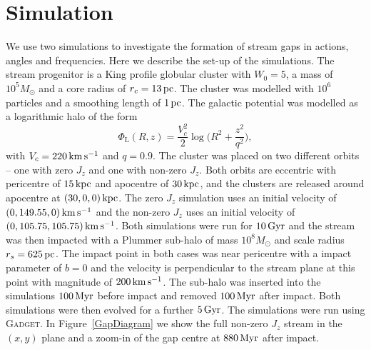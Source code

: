 \documentclass[useAMS,usenatbib,fleqn,a4paper]{mn2e}
\def\kpc{\,{\rm kpc}}
\def\pc{\,{\rm pc}}
\def\kms{\,{\rm km\,s^{-1}}}
\def\Gyr{\,{\rm Gyr}}
\def\Myr{\,{\rm Myr}}
\begin{document}
\section{Simulation}
We use two simulations to investigate the formation of stream gaps in actions, angles and frequencies. Here we describe the set-up of the simulations. The stream progenitor is a King profile globular cluster with $W_0=5$, a mass of $10^5 M_\odot$ and a core radius of $r_c=13\pc$. The cluster was modelled with $10^6$ particles and a smoothing length of $1\pc$.
The galactic potential was modelled as a logarithmic halo of the form
\begin{equation}
\Phi_\mathrm{L}(R,z) = \frac{V_c^2}{2}\log\Big(R^2+\frac{z^2}{q^2}\Big),
\end{equation}
with $V_c = 220\kms$ and $q = 0.9$. The cluster was placed on two different orbits -- one with zero $J_z$ and one with non-zero $J_z$. Both orbits are eccentric with pericentre of $15\kpc$ and apocentre of $30\kpc$, and the clusters are released around apocentre at $(30,0,0)\kpc$. The zero $J_z$ simulation uses an initial velocity of $(0,149.55,0)\kms$ and the non-zero $J_z$ uses an initial velocity of $(0, 105.75, 105.75)\kms$. Both simulations were run for $10\Gyr$ and the stream was then impacted with a Plummer sub-halo of mass $10^8M_\odot$ and scale radius $r_s=625\pc$. The impact point in both cases was near pericentre with a impact parameter of $b=0$ and the velocity is perpendicular to the stream plane at this point with magnitude of $200\kms$. The sub-halo was inserted into the simulations $100\Myr$ before impact and removed $100\Myr$ after impact. Both simulations were then evolved for a further $5\Gyr$. The simulations were run using \textsc{Gadget}. In Figure~\ref{GapDiagram} we show the full non-zero $J_z$ stream in the $(x,y)$ plane and a zoom-in of the gap centre at $880\Myr$ after impact.
\end{document}
